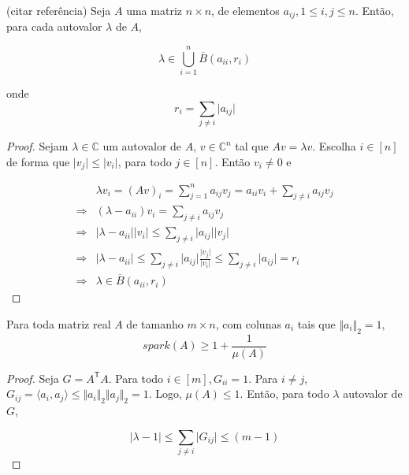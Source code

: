 \begin{teorema}
(citar referência) Seja $A$ uma matriz $n \times n$, de elementos $a_{ij}, 1\leq i,j \leq n$. Então, para cada autovalor $\lambda$ de $A$,

$$ \lambda \in \bigcup_{i = 1}^n \overline{B}(a_{ii}, r_i) $$

onde $$r_i = \sum_{j \neq i} \vert a_{ij} \vert$$
\end{teorema}
\begin{proof}
Sejam $\lambda \in \mathbb{C}$ um autovalor de $A$, $v \in \mathbb{C}^{n}$ tal que $Av = \lambda v$. Escolha $i \in [n]$ de forma que $\vert v_j \vert \leq \vert v_i \vert$, para todo $j \in [n]$. Então $v_i \neq 0$ e

\begin{subequations}
\begin{align*}
& \lambda v_i = (Av)_i
= \sum_{j = 1}^n a_{ij}v_j
= a_{ii}v_i + \sum_{j \neq i} a_{ij}v_j
\\ \Rightarrow &
(\lambda - a_{ii})v_i = \sum_{j \neq i} a_{ij}v_j
\\ \Rightarrow &
\vert \lambda - a_{ii} \vert \vert v_i \vert \leq \sum_{j \neq i} \vert a_{ij} \vert \vert v_j \vert
\\ \Rightarrow &
\vert \lambda - a_{ii} \vert \leq
\sum_{j \neq i} \vert a_{ij} \vert \frac{ \vert v_j \vert}{\vert v_i \vert}
\leq \sum_{j \neq i} \vert a_{ij} \vert = r_i
\\ \Rightarrow &
\lambda \in \overline{B}(a_{ii}, r_i)
\end{align*}
\end{subequations}
\end{proof}

\begin{lema}
Para toda matriz real $A$ de tamanho $m \times n$, com colunas $a_i$ tais que $\Vert a_i \Vert_2 = 1,$
$$spark(A) \geq 1 + \frac{1}{\mu(A)}$$
\end{lema}
\begin{proof}
Seja $G = A^{\mathsf{T}}A$. Para todo  $i \in [m], G_{ii} = 1$. Para $i \neq j$, $G_{ij} = \langle a_i, a_j \rangle \leq \Vert a_i \Vert_2 \Vert a_j \Vert_2 = 1$. Logo, $\mu(A) \leq 1$. Então, para todo $\lambda$ autovalor de $G$,

$$ \vert \lambda - 1 \vert \leq \sum_{j \neq i} \vert G_{ij} \vert \leq (m - 1)$$

\end{proof}

